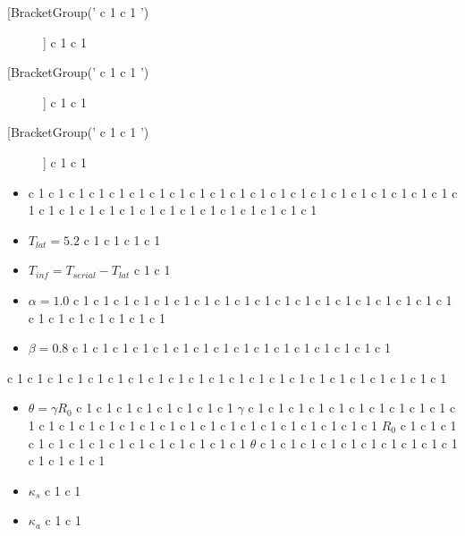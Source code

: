 \documentclass[11pt]{article}
\begin{document}
    \begin{description}
        \item[[BracketGroup('  c 1    c 1 ')]]  c 1    c 1 
\item[[BracketGroup('  c 1    c 1 ')]]  c 1    c 1 
\item[[BracketGroup('  c 1    c 1 ')]]  c 1    c 1 
\end{description}

    \begin{itemize}
	\item  c 1    c 1    c 1    c 1    c 1    c 1    c 1    c 1    c 1    c 1 
  c 1    c 1    c 1    c 1    c 1    c 1    c 1    c 1    c 1    c 1    c 1    c 1    c 1    c 1    c 1    c 1    c 1    c 1    c 1    c 1    c 1    c 1    c 1    c 1    c 1    c 1 
\item $T_{lat}=5.2$  c 1    c 1    c 1    c 1 

\item $T_{inf}=T_{serial}-T_{lat}$  c 1    c 1 
\item $\alpha=1.0$  c 1    c 1    c 1    c 1    c 1    c 1    c 1    c 1    c 1    c 1    c 1    c 1    c 1    c 1    c 1    c 1    c 1    c 1    c 1    c 1 
  c 1    c 1    c 1    c 1    c 1    c 1 
\item $\beta=0.8$  c 1    c 1    c 1    c 1    c 1    c 1    c 1    c 1    c 1    c 1    c 1    c 1    c 1    c 1    c 1    c 1 
\end{itemize}

  c 1    c 1    c 1    c 1    c 1    c 1    c 1    c 1    c 1    c 1    c 1    c 1    c 1    c 1    c 1    c 1    c 1    c 1    c 1    c 1    c 1    c 1 

\begin{itemize}
   \item $\theta=\gamma R_0$  c 1    c 1    c 1    c 1    c 1    c 1    c 1    c 1 $\gamma$  c 1    c 1 
  c 1    c 1    c 1    c 1    c 1    c 1    c 1    c 1    c 1    c 1    c 1    c 1    c 1    c 1    c 1    c 1    c 1    c 1    c 1    c 1    c 1    c 1    c 1    c 1    c 1    c 1 
$R_0$  c 1    c 1    c 1    c 1    c 1    c 1    c 1    c 1    c 1    c 1    c 1    c 1    c 1    c 1 $\theta$  c 1    c 1    c 1    c 1 
  c 1    c 1    c 1    c 1    c 1    c 1    c 1    c 1    c 1    c 1 
\item $\kappa _s$  c 1    c 1 
\item $\kappa _a$  c 1    c 1 
\end{itemize}
\end{document}
